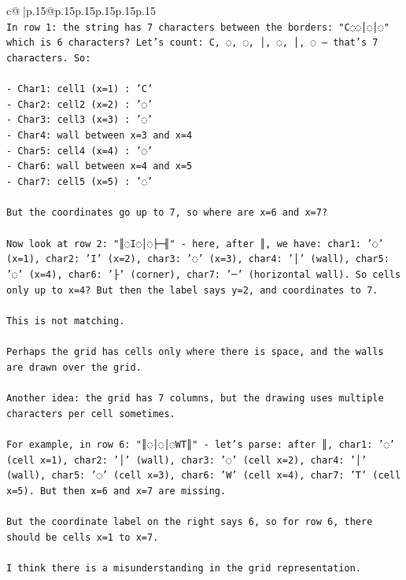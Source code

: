 \documentclass{article}
\begin{document}
{\begin{supertabular}{c@{$\;$}|p{.15\linewidth}@{}p{.15\linewidth}p{.15\linewidth}p{.15\linewidth}p{.15\linewidth}p{.15\linewidth}}
{{{\\ 
\texttt{In row 1: the string has 7 characters between the borders: "C◌◌│◌│◌" which is 6 characters? Let's count: C, ◌, ◌, │, ◌, │, ◌ — that's 7 characters. So:} \\
\\ 
\texttt{{-} Char1: cell1 (x=1) : 'C'} \\
\texttt{{-} Char2: cell2 (x=2) : '◌'} \\
\texttt{{-} Char3: cell3 (x=3) : '◌'} \\
\texttt{{-} Char4: wall between x=3 and x=4} \\
\texttt{{-} Char5: cell4 (x=4) : '◌'} \\
\texttt{{-} Char6: wall between x=4 and x=5} \\
\texttt{{-} Char7: cell5 (x=5) : '◌'} \\
\\ 
\texttt{But the coordinates go up to 7, so where are x=6 and x=7?} \\
\\ 
\texttt{Now look at row 2: "║◌I◌│◌├─╢" {-} here, after ║, we have: char1: '◌' (x=1), char2: 'I' (x=2), char3: '◌' (x=3), char4: '│' (wall), char5: '◌' (x=4), char6: '├' (corner), char7: '─' (horizontal wall). So cells only up to x=4? But then the label says y=2, and coordinates to 7.} \\
\\ 
\texttt{This is not matching.} \\
\\ 
\texttt{Perhaps the grid has cells only where there is space, and the walls are drawn over the grid.} \\
\\ 
\texttt{Another idea: the grid has 7 columns, but the drawing uses multiple characters per cell sometimes.} \\
\\ 
\texttt{For example, in row 6: "║◌│◌│◌WT║" {-} let's parse: after ║, char1: '◌' (cell x=1), char2: '│' (wall), char3: '◌' (cell x=2), char4: '│' (wall), char5: '◌' (cell x=3), char6: 'W' (cell x=4), char7: 'T' (cell x=5). But then x=6 and x=7 are missing.} \\
\\ 
\texttt{But the coordinate label on the right says 6, so for row 6, there should be cells x=1 to x=7.} \\
\\ 
\texttt{I think there is a misunderstanding in the grid representation.} \\
\\ 
}}}
\end{supertabular}}
\end{document}
